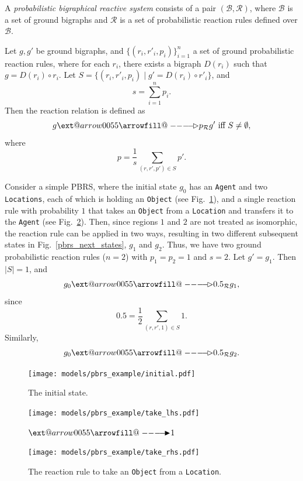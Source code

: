 \documentclass[runningheads]{llncs}
\makeatletter
\providecommand\longrightarrowRHD{\relbar\joinrel\relbar\joinrel\mathrel\RHD}
\providecommand\longrightarrowrhd{\relbar\joinrel\relbar\joinrel\mathrel\rhd}
\providecommand*\xrightarrowRHD[2][]{\ext@arrow 0055{\arrowfill@\relbar\relbar\longrightarrowRHD}{#1}{#2}}
\providecommand*\xrightarrowrhd[2][]{\ext@arrow 0055{\arrowfill@\relbar\relbar\longrightarrowrhd}{#1}{#2}}
\makeatother
\begin{document}
\begin{definition}
  A \emph{probabilistic bigraphical reactive system} consists of a pair
  $(\mathcal{B}, \mathcal{R})$, where $\mathcal{B}$ is a set of ground bigraphs
  and $\mathcal{R}$ is a set of probabilistic reaction rules defined over
  $\mathcal{B}$.

  Let $g, g'$ be ground bigraphs, and $\{ (r_i, r'_i, p_i) \}_{i=1}^n$ a set of
  ground probabilistic reaction rules, where for each $r_i$, there exists a
  bigraph $D(r_i)$ such that $g = D(r_i) \circ r_i$. Let $S = \{ (r_i, r'_i,
  p_i) \mid g' = D(r_i) \circ r'_i \}$, and
  \[ s = \sum_{i=1}^n p_i. \]
  Then the reaction relation is defined as
  \[ g \xrightarrowrhd{p}_{\mathcal{R}} g' \text{ iff } S \ne \emptyset, \]
  where
  \[ p = \frac{1}{s}\sum_{(r, r', p') \in S} p'. \]
\end{definition}

\begin{example}
  Consider a simple PBRS, where the initial state $g_0$ has an \texttt{Agent}
  and two \texttt{Locations}, each of which is holding an \texttt{Object} (see
  Fig.~\ref{pbrs_initial}), and a single reaction rule with probability $1$ that
  takes an \texttt{Object} from a \texttt{Location} and transfers it to the
  \texttt{Agent} (see Fig.~\ref{pbrs_rule}). Then, since regions $1$ and $2$ are
  not treated as isomorphic, the reaction rule can be applied in two ways,
  resulting in two different subsequent states in Fig.~\ref{pbrs_next_states},
  $g_1$ and $g_2$. Thus, we have two ground probabilistic reaction rules ($n =
  2$) with $p_1 = p_2 = 1$ and $s = 2$. Let $g' = g_1$. Then $|S| = 1$, and
  \[ g_0 \xrightarrowrhd{0.5}_{\mathcal{R}} g_1, \]
  since
  \[ 0.5 = \frac{1}{2} \sum_{(r, r', 1) \in S} 1. \]
  Similarly,
  \[ g_0 \xrightarrowrhd{0.5}_{\mathcal{R}} g_2. \]
\end{example}

\begin{figure}
  \centering
  \texttt{[image: models/pbrs\_example/initial.pdf]}
  \caption{The initial state.}
  \label{pbrs_initial}
\end{figure}

\begin{figure}
  \centering
  \begin{minipage}{0.45\textwidth}
    \centering
    \texttt{[image: models/pbrs\_example/take\_lhs.pdf]}
  \end{minipage}
  $\xrightarrowRHD{1}$
  \begin{minipage}{0.45\textwidth}
    \centering
    \texttt{[image: models/pbrs\_example/take\_rhs.pdf]}
  \end{minipage}
  \caption{The reaction rule to take an \texttt{Object} from a
    \texttt{Location}.}
  \label{pbrs_rule}
\end{figure}
\end{document}
